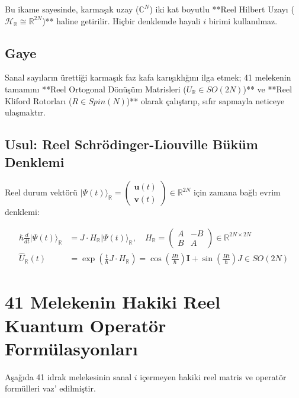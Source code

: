 \documentclass[11pt, a4paper]{article}
\begin{document}
Bu ikame sayesinde, karmaşık uzay ($\mathbb{C}^N$) iki kat boyutlu **Reel Hilbert Uzayı ($\mathcal{H}_{\mathbb{R}} \cong \mathbb{R}^{2N}$)** haline getirilir. Hiçbir denklemde hayali $i$ birimi kullanılmaz.

\subsection{Gaye}
Sanal sayıların ürettiği karmaşık faz kafa karışıklığını ilga etmek; 41 melekenin tamamını **Reel Ortogonal Dönüşüm Matrisleri ($U_{\mathbb{R}} \in SO(2N)$)** ve **Reel Kliford Rotorları ($R \in Spin(N)$)** olarak çalıştırıp, sıfır sapmayla neticeye ulaşmaktır.

\subsection{Usul: Reel Schrödinger-Liouville Büküm Denklemi}
Reel durum vektörü $|\Psi(t)\rangle_{\mathbb{R}} = \begin{pmatrix} \mathbf{u}(t) \\ \mathbf{v}(t) \end{pmatrix} \in \mathbb{R}^{2N}$ için zamana bağlı evrim denklemi:

\begin{align}
\hbar \frac{d}{dt} |\Psi(t)\rangle_{\mathbb{R}} &= J \cdot H_{\mathbb{R}} |\Psi(t)\rangle_{\mathbb{R}}, \quad H_{\mathbb{R}} = \begin{pmatrix} A & -B \\ B & A \end{pmatrix} \in \mathbb{R}^{2N \times 2N} \\
\hat{U}_{\mathbb{R}}(t) &= \exp\left( \frac{t}{\hbar} J \cdot H_{\mathbb{R}} \right) = \cos\left( \frac{H t}{\hbar} \right) \mathbf{I} + \sin\left( \frac{H t}{\hbar} \right) J \in SO(2N)
\end{align}

\section{41 Melekenin Hakiki Reel Kuantum Operatör Formülasyonları}

Aşağıda 41 idrak melekesinin sanal $i$ içermeyen hakiki reel matris ve operatör formülleri vaz' edilmiştir.
\end{document}
